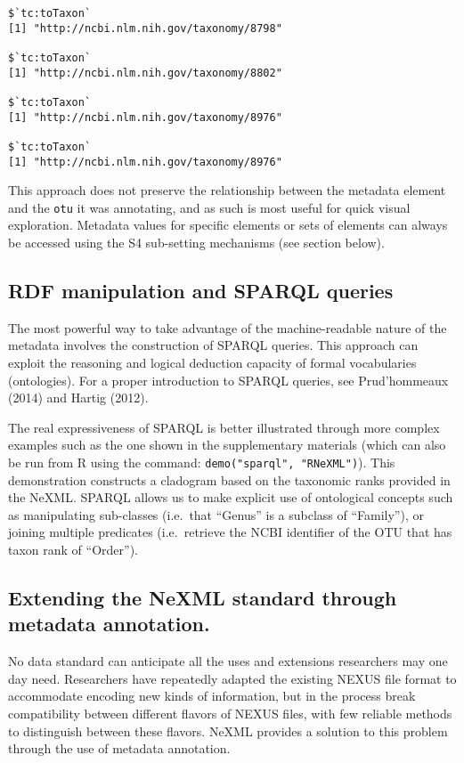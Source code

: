 \documentclass[author-year, review, 11pt]{components/elsarticle} %
\begin{document}
\begin{verbatim}
$`tc:toTaxon`
[1] "http://ncbi.nlm.nih.gov/taxonomy/8798"

$`tc:toTaxon`
[1] "http://ncbi.nlm.nih.gov/taxonomy/8802"

$`tc:toTaxon`
[1] "http://ncbi.nlm.nih.gov/taxonomy/8976"

$`tc:toTaxon`
[1] "http://ncbi.nlm.nih.gov/taxonomy/8976"
\end{verbatim}

This approach does not preserve the relationship between the metadata
element and the \texttt{otu} it was annotating, and as such is most
useful for quick visual exploration. Metadata values for specific
elements or sets of elements can always be accessed using the S4
sub-setting mechanisms (see section below).

\subsection{RDF manipulation and SPARQL
queries}\label{rdf-manipulation-and-sparql-queries}

The most powerful way to take advantage of the machine-readable nature
of the metadata involves the construction of SPARQL queries. This
approach can exploit the reasoning and logical deduction capacity of
formal vocabularies (ontologies). For a proper introduction to SPARQL
queries, see Prud'hommeaux (2014) and Hartig (2012).

The real expressiveness of SPARQL is better illustrated through more
complex examples such as the one shown in the supplementary materials
(which can also be run from R using the command:
\texttt{demo("sparql", "RNeXML")}). This demonstration constructs a
cladogram based on the taxonomic ranks provided in the NeXML. SPARQL
allows us to make explicit use of ontological concepts such as
manipulating sub-classes (i.e.~that ``Genus'' is a subclass of
``Family''), or joining multiple predicates (i.e.~retrieve the NCBI
identifier of the OTU that has taxon rank of ``Order'').

\subsection{Extending the NeXML standard through metadata
annotation.}\label{extending-the-nexml-standard-through-metadata-annotation.}

No data standard can anticipate all the uses and extensions researchers
may one day need. Researchers have repeatedly adapted the existing NEXUS
file format to accommodate encoding new kinds of information, but in the
process break compatibility between different flavors of NEXUS files,
with few reliable methods to distinguish between these flavors. NeXML
provides a solution to this problem through the use of metadata
annotation.
\end{document}
